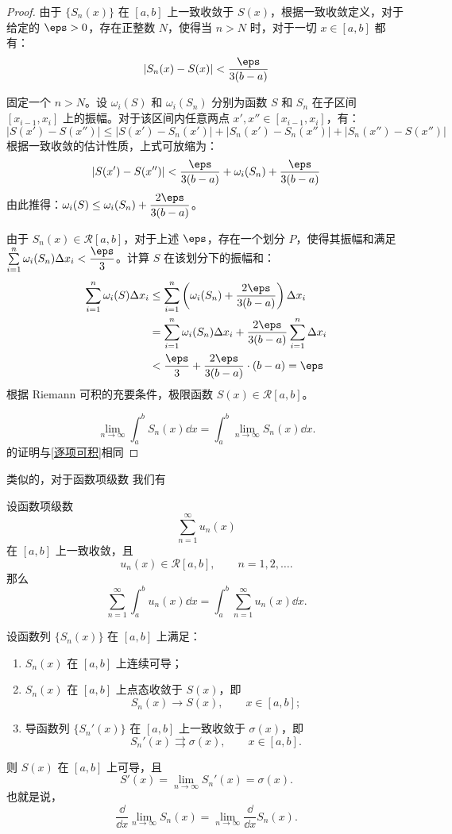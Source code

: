 \begin{proof}
	由于 $\{S_n(x)\}$ 在 $[a, b]$ 上一致收敛于 $S(x)$，根据一致收敛定义，对于给定的 $\eps > 0$，存在正整数 $N$，使得当 $n > N$ 时，对于一切 $x \in [a, b]$ 都有：
	\[ |S_n(x) - S(x)| < \frac{\eps}{3(b-a)} \]
	
	固定一个 $n > N$。设 $\omega_i(S)$ 和 $\omega_i(S_n)$ 分别为函数 $S$ 和 $S_n$ 在子区间 $[x_{i-1}, x_i]$ 上的振幅。对于该区间内任意两点 $x', x'' \in [x_{i-1}, x_i]$，有：
	\[ |S(x') - S(x'')| \le |S(x') - S_n(x')| + |S_n(x') - S_n(x'')| + |S_n(x'') - S(x'')| \]
	根据一致收敛的估计性质，上式可放缩为：
	\[ |S(x') - S(x'')| < \frac{\eps}{3(b-a)} + \omega_i(S_n) + \frac{\eps}{3(b-a)} \]
	由此推得：$\omega_i(S) \le \omega_i(S_n) + \dfrac{2\eps}{3(b-a)}$。
	
	由于 $S_n(x) \in \mathcal{R}[a, b]$，对于上述 $\eps$，存在一个划分 $P$，使得其振幅和满足 $\sum\limits_{i=1}^n \omega_i(S_n) \Delta x_i < \dfrac{\eps}{3}$。计算 $S$ 在该划分下的振幅和：
	\begin{align*}
		\sum_{i=1}^n \omega_i(S) \Delta x_i &\le \sum_{i=1}^n \left( \omega_i(S_n) + \frac{2\eps}{3(b-a)} \right) \Delta x_i \\
		&= \sum_{i=1}^n \omega_i(S_n) \Delta x_i + \frac{2\eps}{3(b-a)} \sum_{i=1}^n \Delta x_i \\
		&< \frac{\eps}{3} + \frac{2\eps}{3(b-a)} \cdot (b-a) = \eps
	\end{align*}
	根据 Riemann 可积的充要条件，极限函数 $S(x) \in \mathcal{R}[a, b]$。
	
	\[
\lim_{n\to\infty}\int_a^b S_n(x)\dd x
=
\int_a^b \lim_{n\to\infty}S_n(x)\dd x .
\]的证明与\ref{逐项可积}相同
\end{proof}


类似的，对于函数项级数 我们有

设函数项级数
\[
\sum_{n=1}^{\infty}u_n(x)
\]
在 $[a,b]$ 上一致收敛，且
\[
u_n(x)\in \mathcal{R}[a,b],\qquad n=1,2,\dots .
\]
那么
\[
\sum_{n=1}^{\infty}\int_a^b u_n(x)\dd x
=
\int_a^b \sum_{n=1}^{\infty}u_n(x)\dd x .
\]
\begin{proposition}
	设函数列 $\{S_n(x)\}$ 在 $[a,b]$ 上满足：
	
	\begin{enumerate}
		\item $S_n(x)$ 在 $[a,b]$ 上连续可导；
		\item $S_n(x)$ 在 $[a,b]$ 上点态收敛于 $S(x)$，即
		\[
		S_n(x)\to S(x),\qquad x\in [a,b];
		\]
		\item 导函数列 $\{S_n'(x)\}$ 在 $[a,b]$ 上一致收敛于 $\sigma(x)$，即
		\[
		S_n'(x)\rightrightarrows \sigma(x),\qquad x\in [a,b].
		\]
	\end{enumerate}
	
	则 $S(x)$ 在 $[a,b]$ 上可导，且
	\[
	S'(x)=\lim_{n\to\infty}S_n'(x)=\sigma(x).
	\]
	也就是说，
	\[
	\frac{\dd}{\dd x}\lim_{n\to\infty}S_n(x)
	=
	\lim_{n\to\infty}\frac{\dd}{\dd x}S_n(x).
	\]
\end{proposition}

